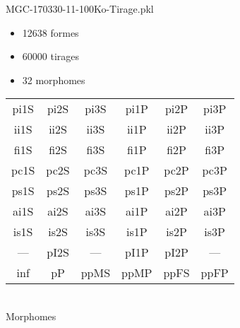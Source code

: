 MGC-170330-11-100Ko-Tirage.pkl
\begin{itemize}
\item 12638 formes
\item 60000 tirages
\item 32 morphomes
\end{itemize}
\begin{center}
\begin{tabular}{cccccc}
\hline
\cellcolor{white}pi1S & \cellcolor{orange}pi2S & \cellcolor{orange}pi3S & \cellcolor{white}pi1P & \cellcolor{white}pi2P & \cellcolor{white}pi3P\\
\cellcolor{brown}ii1S & \cellcolor{brown}ii2S & \cellcolor{brown}ii3S & \cellcolor{white}ii1P & \cellcolor{white}ii2P & \cellcolor{brown}ii3P\\
\cellcolor{yellow}fi1S & \cellcolor{lime}fi2S & \cellcolor{lime}fi3S & \cellcolor{green}fi1P & \cellcolor{white}fi2P & \cellcolor{green}fi3P\\
\cellcolor{yellow}pc1S & \cellcolor{yellow}pc2S & \cellcolor{yellow}pc3S & \cellcolor{white}pc1P & \cellcolor{white}pc2P & \cellcolor{yellow}pc3P\\
\cellcolor{teal}ps1S & \cellcolor{white}ps2S & \cellcolor{teal}ps3S & \cellcolor{white}ps1P & \cellcolor{white}ps2P & \cellcolor{teal}ps3P\\
\cellcolor{white}ai1S & \cellcolor{lightgray}ai2S & \cellcolor{lightgray}ai3S & \cellcolor{white}ai1P & \cellcolor{pink}ai2P & \cellcolor{white}ai3P\\
\cellcolor{pink}is1S & \cellcolor{pink}is2S & \cellcolor{lightgray}is3S & \cellcolor{pink}is1P & \cellcolor{black}is2P & \cellcolor{pink}is3P\\
--- & \cellcolor{white}pI2S & --- & \cellcolor{white}pI1P & \cellcolor{white}pI2P & ---\\
\cellcolor{white}inf & \cellcolor{white}pP & \cellcolor{white}ppMS & \cellcolor{white}ppMP & \cellcolor{white}ppFS & \cellcolor{white}ppFP\\
\hline
\end{tabular}\\
Morphomes
\end{center}
\bigskip

